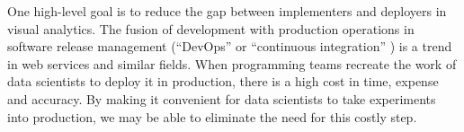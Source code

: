 One high-level goal is to reduce the gap between implementers and
deployers in visual analytics. The fusion of development with
production operations in software release management (``DevOps''
\cite{Httermann:2012:DD} or ``continuous integration''
\cite{Fowler:2006:Continuous}) is a trend in web services and similar
fields.
When programming teams recreate the work of data scientists to
deploy it in production, there is a high cost in time, expense and
accuracy. By making it convenient for data scientists to take
experiments into production, we may be able to eliminate the need for this costly step.



